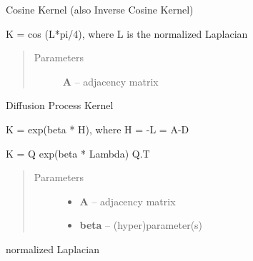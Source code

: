 \documentclass[letterpaper,10pt,english]{sphinxmanual}
\begin{document}
\begin{fulllineitems}
\label{Graph:pyGPs.GraphStuff.kernels_on_graph.cosKernel}
Cosine Kernel (also Inverse Cosine Kernel)

K = cos (L*pi/4), where L is the normalized Laplacian
\begin{quote}\begin{description}
\item[{Parameters}] \leavevmode
\textbf{A} -- adjacency matrix

\end{description}\end{quote}

\end{fulllineitems}


\begin{fulllineitems}
\label{Graph:pyGPs.GraphStuff.kernels_on_graph.diffKernel}
Diffusion Process Kernel

K = exp(beta * H), where H = -L = A-D

K = Q exp(beta * Lambda) Q.T
\begin{quote}\begin{description}
\item[{Parameters}] \leavevmode\begin{itemize}
\item {} 
\textbf{A} -- adjacency matrix

\item {} 
\textbf{beta} -- (hyper)parameter(s)

\end{itemize}

\end{description}\end{quote}

\end{fulllineitems}


\begin{fulllineitems}
\label{Graph:pyGPs.GraphStuff.kernels_on_graph.normLap}
normalized Laplacian

\end{fulllineitems}
\end{document}
